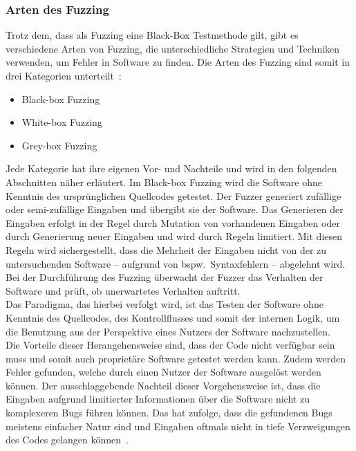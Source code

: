 
\subsubsection{Arten des Fuzzing}\label{subsubsec:arten-des-fuzzing}
Trotz dem, dass als Fuzzing eine Black-Box Testmethode gilt, gibt es verschiedene Arten von Fuzzing, die unterschiedliche
Strategien und Techniken verwenden, um Fehler in Software zu finden.
Die Arten des Fuzzing sind somit in drei Kategorien unterteilt~\cite{iot-fuzzing}:
\begin{itemize}
    \item Black-box Fuzzing
    \item White-box Fuzzing
    \item Grey-box Fuzzing
\end{itemize}
Jede Kategorie hat ihre eigenen Vor- und Nachteile und wird in den folgenden Abschnitten näher erläutert.\newline
Im Black-box Fuzzing wird die Software ohne Kenntnis des ursprünglichen Quellcodes getestet.
Der Fuzzer generiert zufällige oder semi-zufällige Eingaben und übergibt sie der Software.
Das Generieren der Eingaben erfolgt in der Regel durch Mutation von vorhandenen Eingaben oder durch Generierung neuer Eingaben
und wird durch Regeln limitiert.
Mit diesen Regeln wird sichergestellt, dass die Mehrheit der Eingaben nicht von der zu untersuchenden Software -- aufgrund
von bspw.\ Syntaxfehlern -- abgelehnt wird.
Bei der Durchführung des Fuzzing überwacht der Fuzzer das Verhalten der Software und prüft, ob unerwartetes Verhalten auftritt. \\
Das Paradigma, das hierbei verfolgt wird, ist das Testen der Software ohne Kenntnis des Quellcodes, des Kontrollflusses und somit der internen
Logik, um die Benutzung aus der Perspektive eines Nutzers der Software nachzustellen.\\
Die Vorteile dieser Herangehensweise sind, dass der Code nicht verfügbar sein muss und somit auch proprietäre Software getestet werden kann.
Zudem werden Fehler gefunden, welche durch einen Nutzer der Software ausgelöst werden können.
Der ausschlaggebende Nachteil dieser Vorgehensweise ist, dass die Eingaben aufgrund limitierter Informationen über die Software
nicht zu komplexeren Bugs führen können.
Das hat zufolge, dass die gefundenen Bugs meistens einfacher Natur sind und Eingaben oftmals nicht in tiefe Verzweigungen des Codes
gelangen können~\cite{black-box-fuzzing}.\newline\newline
